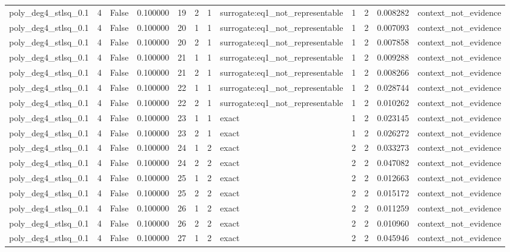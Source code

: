 \begin{tabular}{lrrrrrrlrrrl}
poly\_deg4\_stlsq\_0.1 & 4 & False & 0.100000 & 19 & 2 & 1 & surrogate:eq1\_not\_representable & 1 & 2 & 0.008282 & context\_not\_evidence \\
poly\_deg4\_stlsq\_0.1 & 4 & False & 0.100000 & 20 & 1 & 1 & surrogate:eq1\_not\_representable & 1 & 2 & 0.007093 & context\_not\_evidence \\
poly\_deg4\_stlsq\_0.1 & 4 & False & 0.100000 & 20 & 2 & 1 & surrogate:eq1\_not\_representable & 1 & 2 & 0.007858 & context\_not\_evidence \\
poly\_deg4\_stlsq\_0.1 & 4 & False & 0.100000 & 21 & 1 & 1 & surrogate:eq1\_not\_representable & 1 & 2 & 0.009288 & context\_not\_evidence \\
poly\_deg4\_stlsq\_0.1 & 4 & False & 0.100000 & 21 & 2 & 1 & surrogate:eq1\_not\_representable & 1 & 2 & 0.008266 & context\_not\_evidence \\
poly\_deg4\_stlsq\_0.1 & 4 & False & 0.100000 & 22 & 1 & 1 & surrogate:eq1\_not\_representable & 1 & 2 & 0.028744 & context\_not\_evidence \\
poly\_deg4\_stlsq\_0.1 & 4 & False & 0.100000 & 22 & 2 & 1 & surrogate:eq1\_not\_representable & 1 & 2 & 0.010262 & context\_not\_evidence \\
poly\_deg4\_stlsq\_0.1 & 4 & False & 0.100000 & 23 & 1 & 1 & exact & 1 & 2 & 0.023145 & context\_not\_evidence \\
poly\_deg4\_stlsq\_0.1 & 4 & False & 0.100000 & 23 & 2 & 1 & exact & 1 & 2 & 0.026272 & context\_not\_evidence \\
poly\_deg4\_stlsq\_0.1 & 4 & False & 0.100000 & 24 & 1 & 2 & exact & 2 & 2 & 0.033273 & context\_not\_evidence \\
poly\_deg4\_stlsq\_0.1 & 4 & False & 0.100000 & 24 & 2 & 2 & exact & 2 & 2 & 0.047082 & context\_not\_evidence \\
poly\_deg4\_stlsq\_0.1 & 4 & False & 0.100000 & 25 & 1 & 2 & exact & 2 & 2 & 0.012663 & context\_not\_evidence \\
poly\_deg4\_stlsq\_0.1 & 4 & False & 0.100000 & 25 & 2 & 2 & exact & 2 & 2 & 0.015172 & context\_not\_evidence \\
poly\_deg4\_stlsq\_0.1 & 4 & False & 0.100000 & 26 & 1 & 2 & exact & 2 & 2 & 0.011259 & context\_not\_evidence \\
poly\_deg4\_stlsq\_0.1 & 4 & False & 0.100000 & 26 & 2 & 2 & exact & 2 & 2 & 0.010960 & context\_not\_evidence \\
poly\_deg4\_stlsq\_0.1 & 4 & False & 0.100000 & 27 & 1 & 2 & exact & 2 & 2 & 0.045946 & context\_not\_evidence \\

\end{tabular}
